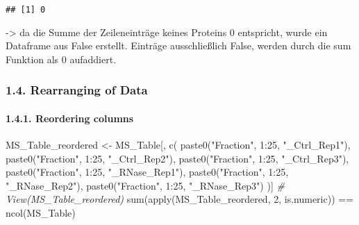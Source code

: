 \documentclass[
]{article}
\newenvironment{Shaded}{\begin{snugshade}}{\end{snugshade}}
\newcommand{\CommentTok}[1]{\textcolor[rgb]{0.56,0.35,0.01}{\textit{#1}}}
\newcommand{\DecValTok}[1]{\textcolor[rgb]{0.00,0.00,0.81}{#1}}
\newcommand{\FunctionTok}[1]{\textcolor[rgb]{0.00,0.00,0.00}{#1}}
\newcommand{\NormalTok}[1]{#1}
\newcommand{\OtherTok}[1]{\textcolor[rgb]{0.56,0.35,0.01}{#1}}
\newcommand{\SpecialCharTok}[1]{\textcolor[rgb]{0.00,0.00,0.00}{#1}}
\newcommand{\StringTok}[1]{\textcolor[rgb]{0.31,0.60,0.02}{#1}}
\begin{document}
\begin{verbatim}
## [1] 0
\end{verbatim}

-\textgreater{} da die Summe der Zeileneinträge keines Proteins 0
entspricht, wurde ein Dataframe aus False erstellt. Einträge
ausschließlich False, werden durch die sum Funktion als 0 aufaddiert.

\hypertarget{rearranging-of-data}{%
\subsubsection{1.4. Rearranging of Data}\label{rearranging-of-data}}

\hypertarget{reordering-columns}{%
\paragraph{1.4.1. Reordering columns}\label{reordering-columns}}

\begin{Shaded}
\begin{Highlighting}[]
\NormalTok{MS\_Table\_reordered }\OtherTok{\textless{}{-}}\NormalTok{ MS\_Table[, }\FunctionTok{c}\NormalTok{(}
  \FunctionTok{paste0}\NormalTok{(}\StringTok{"Fraction"}\NormalTok{, }\DecValTok{1}\SpecialCharTok{:}\DecValTok{25}\NormalTok{, }\StringTok{"\_Ctrl\_Rep1"}\NormalTok{),}
  \FunctionTok{paste0}\NormalTok{(}\StringTok{"Fraction"}\NormalTok{, }\DecValTok{1}\SpecialCharTok{:}\DecValTok{25}\NormalTok{, }\StringTok{"\_Ctrl\_Rep2"}\NormalTok{),}
  \FunctionTok{paste0}\NormalTok{(}\StringTok{"Fraction"}\NormalTok{, }\DecValTok{1}\SpecialCharTok{:}\DecValTok{25}\NormalTok{, }\StringTok{"\_Ctrl\_Rep3"}\NormalTok{),}
  \FunctionTok{paste0}\NormalTok{(}\StringTok{"Fraction"}\NormalTok{, }\DecValTok{1}\SpecialCharTok{:}\DecValTok{25}\NormalTok{, }\StringTok{"\_RNase\_Rep1"}\NormalTok{),}
  \FunctionTok{paste0}\NormalTok{(}\StringTok{"Fraction"}\NormalTok{, }\DecValTok{1}\SpecialCharTok{:}\DecValTok{25}\NormalTok{, }\StringTok{"\_RNase\_Rep2"}\NormalTok{),}
  \FunctionTok{paste0}\NormalTok{(}\StringTok{"Fraction"}\NormalTok{, }\DecValTok{1}\SpecialCharTok{:}\DecValTok{25}\NormalTok{, }\StringTok{"\_RNase\_Rep3"}\NormalTok{)}
\NormalTok{)]}
\CommentTok{\# View(MS\_Table\_reordered)}
\FunctionTok{sum}\NormalTok{(}\FunctionTok{apply}\NormalTok{(MS\_Table\_reordered, }\DecValTok{2}\NormalTok{, is.numeric)) }\SpecialCharTok{==} \FunctionTok{ncol}\NormalTok{(MS\_Table)}
\end{Highlighting}
\end{Shaded}
\end{document}
